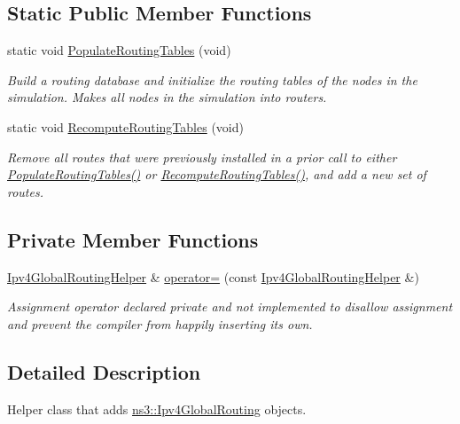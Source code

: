 \subsection*{Static Public Member Functions}
\begin{DoxyCompactItemize}
\item 
static void \hyperlink{classns3_1_1Ipv4GlobalRoutingHelper_a540c7339880774ff18a459238ef5a7b2}{Populate\+Routing\+Tables} (void)
\begin{DoxyCompactList}\small\item\em Build a routing database and initialize the routing tables of the nodes in the simulation. Makes all nodes in the simulation into routers. \end{DoxyCompactList}\item 
static void \hyperlink{classns3_1_1Ipv4GlobalRoutingHelper_a0a266b82c78b1252827f77b22d0637ab}{Recompute\+Routing\+Tables} (void)
\begin{DoxyCompactList}\small\item\em Remove all routes that were previously installed in a prior call to either \hyperlink{classns3_1_1Ipv4GlobalRoutingHelper_a540c7339880774ff18a459238ef5a7b2}{Populate\+Routing\+Tables()} or \hyperlink{classns3_1_1Ipv4GlobalRoutingHelper_a0a266b82c78b1252827f77b22d0637ab}{Recompute\+Routing\+Tables()}, and add a new set of routes. \end{DoxyCompactList}\end{DoxyCompactItemize}
\subsection*{Private Member Functions}
\begin{DoxyCompactItemize}
\item 
\hyperlink{classns3_1_1Ipv4GlobalRoutingHelper}{Ipv4\+Global\+Routing\+Helper} \& \hyperlink{classns3_1_1Ipv4GlobalRoutingHelper_a1b8b3ea9c28aa2ac9809055fbb0901c7}{operator=} (const \hyperlink{classns3_1_1Ipv4GlobalRoutingHelper}{Ipv4\+Global\+Routing\+Helper} \&)
\begin{DoxyCompactList}\small\item\em Assignment operator declared private and not implemented to disallow assignment and prevent the compiler from happily inserting its own. \end{DoxyCompactList}\end{DoxyCompactItemize}


\subsection{Detailed Description}
Helper class that adds \hyperlink{classns3_1_1Ipv4GlobalRouting}{ns3\+::\+Ipv4\+Global\+Routing} objects. 

